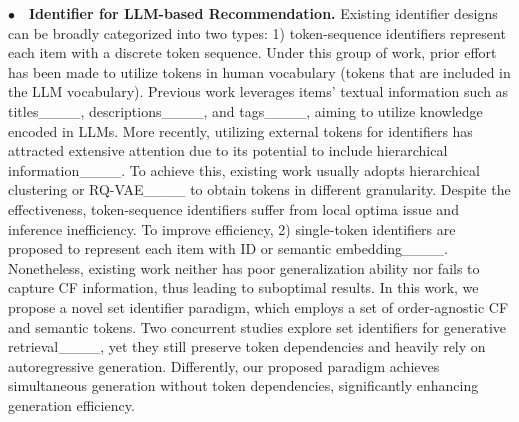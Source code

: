 \vspace{2pt}
\noindent$\bullet\quad$\textbf{Identifier for LLM-based Recommendation.} 
Existing identifier designs can be broadly categorized into two types: 
1) token-sequence identifiers represent each item with a discrete token sequence. 
Under this group of work, 
prior effort has been made to utilize tokens in human vocabulary (\ie tokens that are included in the LLM vocabulary). 
Previous work leverages items' textual information such as titles____, descriptions____, and tags____, aiming to utilize knowledge encoded in LLMs. 
More recently, utilizing external tokens for identifiers has attracted extensive attention due to its potential to include hierarchical information____. 
To achieve this, existing work usually adopts hierarchical clustering or RQ-VAE____ to obtain tokens in different granularity. 
Despite the effectiveness, token-sequence identifiers suffer from local optima issue and inference inefficiency. 
To improve efficiency, 
2) single-token identifiers are proposed to represent each item with ID or semantic embedding____. 
Nonetheless, existing work neither has poor generalization ability nor fails to capture CF information, thus leading to suboptimal results. 
In this work, we propose a novel set identifier paradigm, which employs a set of order-agnostic CF and semantic tokens.  
Two concurrent studies explore set identifiers for generative retrieval____, yet they still preserve token dependencies and heavily rely on autoregressive generation. Differently, our proposed paradigm achieves simultaneous generation without token dependencies, significantly enhancing generation efficiency.